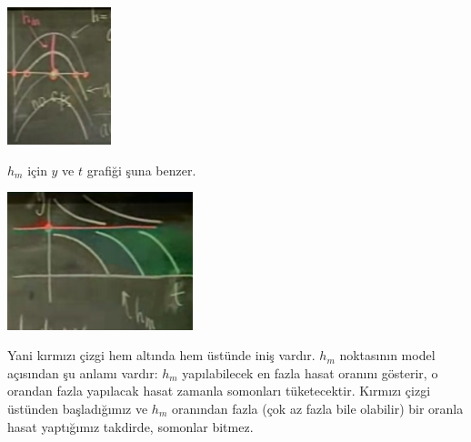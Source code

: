 \documentclass[12pt,fleqn]{article}\usepackage{../../common}
\begin{document}
\includegraphics[height=4cm]{5_11.png}

$h_m$ için $y$ ve $t$ grafiği şuna benzer. 

\includegraphics[height=4cm]{5_12.png}

Yani kırmızı çizgi hem altında hem üstünde iniş vardır. $h_m$ noktasının
model açısından şu anlamı vardır: $h_m$ yapılabilecek en fazla hasat
oranını gösterir, o orandan fazla yapılacak hasat zamanla somonları
tüketecektir. Kırmızı çizgi üstünden başladığımız ve $h_m$ oranından fazla
(çok az fazla bile olabilir) bir oranla hasat yaptığımız takdirde, somonlar
bitmez.
\end{document}
